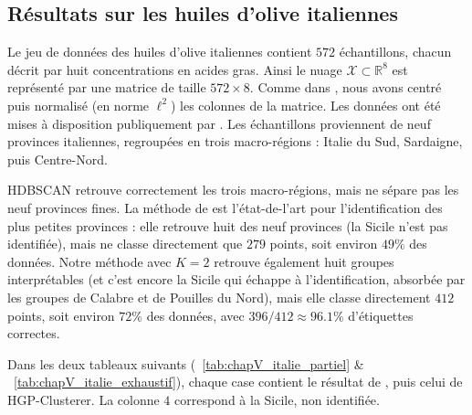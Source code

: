 
\subsection{Résultats sur les huiles d'olive italiennes}
\label{subsec:chapV_huiles_olive}

Le jeu de données des huiles d'olive italiennes \cite{HuileOlive} contient $572$ échantillons, chacun décrit par huit concentrations en acides gras. 
Ainsi le nuage $\mathcal X \subset \mathbb R^8$ est représenté par une matrice de taille $572 \times 8$.
Comme dans \cite{DegreeRipsRolleScoccola}, nous avons centré puis normalisé (en norme $\ell^2$) les colonnes de la matrice.
Les données ont été mises à disposition publiquement par \cite{DonneesHuileOlive}. Les échantillons proviennent de neuf provinces italiennes, regroupées en trois macro-régions : Italie du Sud, Sardaigne, puis Centre-Nord. 


HDBSCAN retrouve correctement les trois macro-régions, mais ne sépare pas les neuf provinces fines. La méthode  de \cite{DegreeRipsRolleScoccola} est l'état-de-l'art pour l'identification des plus petites provinces : elle retrouve huit des neuf provinces (la Sicile n'est pas identifiée), mais ne classe directement que $279$ points, soit environ $49\%$ des données. Notre méthode \cite{BibiAppliedNetworkScience} avec $K=2$ retrouve également huit groupes interprétables (et c'est encore la Sicile qui échappe à l'identification, absorbée par les groupes de Calabre et de Pouilles du Nord), mais elle classe directement $412$ points, soit environ $72\%$ des données, avec $396/412\approx96.1\%$ d'étiquettes correctes.

Dans les deux tableaux suivants (\Tab~\ref{tab:chapV_italie_partiel} \& \Tab~\ref{tab:chapV_italie_exhaustif}), chaque case contient le résultat de , puis celui de HGP-Clusterer. La colonne $4$ correspond à la Sicile, non identifiée.

